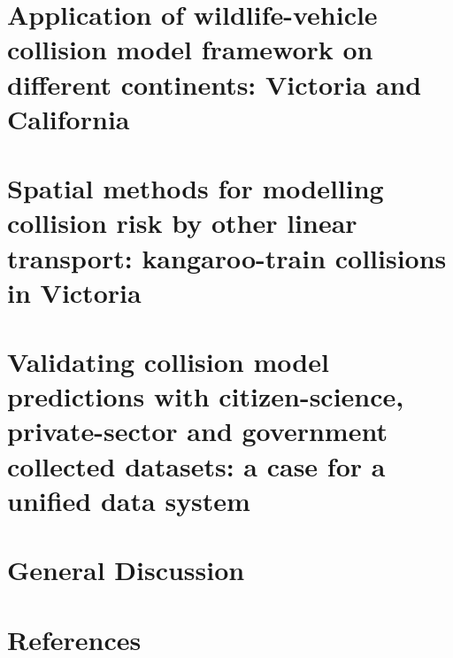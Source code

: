 \documentclass[titlesmallcaps,copyrightpage,examinerscopy]{uomthesis}
\begin{document}
%
\chapter{Application of wildlife-vehicle collision model framework on different continents: Victoria and California}\label{sec:cal}

%
\chapter{Spatial methods for modelling collision risk by other linear transport: kangaroo-train collisions in Victoria}\label{sec:train}

%
\chapter{Validating collision model predictions with citizen-science, private-sector and government collected datasets: a case for a unified data system}\label{sec:val}

%
\chapter{General Discussion}\label{sec:conc}

%

{
\backmatter
\chapter{References}

}

\appendix


%
%
%
%

%


%
%
%
\end{document}
